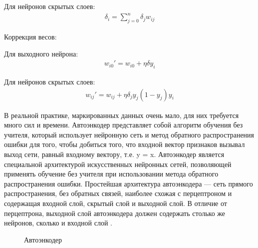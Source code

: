 \documentclass[12pt]{article}
\begin{document}
Для нейронов скрытых слоев:
  \begin{align}
	\delta_i=\sum_{j=0}^n \delta_j w_{ij}
  \end{align}

Коррекция весов:

Для выходного нейрона:
  \begin{align}
	w_{i0}'=w_{i0}+\eta\delta y_i
  \end{align}

Для нейронов скрытых слоев:
  \begin{align}
	w_{ij}'=w_{ij}+\eta\delta_j y_j(1-y_j)y_i
  \end{align}

В реальной практике, маркированных данных очень мало, для них требуется много сил и времени. Автоэнкодер представляет собой алгоритм обучения без учителя, который использует нейронную сеть и метод обратного распространения ошибки для того, чтобы добиться того, что входной вектор признаков вызывал выход сети, равный входному вектору, т.е. y = x. Автоэнкодер является специальной архитектурой искусственных нейронных сетей, позволяющей применять обучение без учителя при использовании метода обратного распространения ошибки. Простейшая архитектура автоэнкодера — сеть прямого распространения, без обратных связей, наиболее схожая с перцептроном и содержащая входной слой, скрытый слой и выходной слой. В отличие от перцептрона, выходной слой автоэнкодера должен содержать столько же нейронов, сколько и входной слой \cite{Stanford2}.

  \begin{figure}[H]
    \noindent{}
    \caption{Автоэнкодер}
    \label{figCurves}
  \end{figure}
\end{document}
